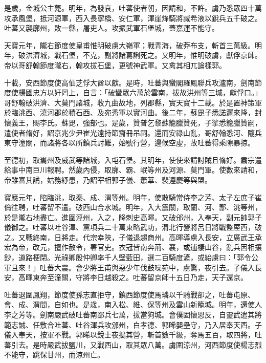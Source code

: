 \begin{pinyinscope}
 是歲，金城公主薨。明年，為發哀，吐蕃使者朝，因請和，不許。虜乃悉眾四十萬攻承風堡，抵河源軍，西入長寧橋、安仁軍，渾崖烽騎將臧希液以銳兵五千破之。吐蕃又襲廓州，敗一縣，屠吏人。攻振武軍石堡城，蓋嘉運不能守。



 天寶元年，隴右節度使皇甫惟明破虜大嶺軍；戰青海，破莽布支，斬首三萬級。明年，破洪濟城，戰石堡，不克，副將諸葛誗死之。又明年，惟明破虜，獻俘京師。帝以哥舒翰節度隴右，翰攻拔石堡，更號神武軍。又禽其相兀論樣郭。



 十載，安西節度使高仙芝俘大酋以獻。是時，吐蕃與蠻閣羅鳳聯兵攻瀘南，劍南節度使楊國忠方以奸罔上，自言：「破蠻眾六萬於雲南，拔故洪州等三城，獻俘口。」哥舒翰破洪濟、大莫門諸城，收九曲故地，列郡縣，實天寶十二載。於是置神策軍於臨洮西、澆河郡於積石西、及宛秀軍以實河曲。後二年，蘇毘子悉諾邏來降，封懷義王，賜李氏。蘇毘，強部也。是歲，贊普乞黎蘇籠臘贊死，子挲悉籠臘贊嗣，遣使者脩好，詔京兆少尹崔光遠持節齎冊吊祠。還而安祿山亂，哥舒翰悉河、隴兵東守潼關，而諸將各以所鎮兵討難，始號行營，邊候空虛，故吐蕃得乘隙暴掠。



 至德初，取巂州及威武等諸城，入屯石堡。其明年，使使來請討賊且脩好。肅宗遣給事中南巨川報聘。然歲內侵，取廓、霸、岷等州及河源、莫門軍。使數來請和，帝雖審其譎，姑務紓患，乃詔宰相郭子儀、蕭華、裴遵慶等與盟。



 寶應元年，陷臨洮，取秦、成、渭等州。明年，使散騎常侍李之芳、太子左庶子崔倫往聘，吐蕃留不遣。破西山合水城。明年，入大震關，取蘭、河、鄯、洮等州，於是隴右地盡亡。進圍涇州，入之，降刺史高暉。又破邠州，入奉天，副元帥郭子儀御之。吐蕃以吐谷渾、黨項兵二十萬東略武功，渭北行營將呂日將戰盩厔西，破之。又戰終南，日將走。代宗幸陜，子儀退趨商州。高暉導虜入長安，立廣武王承宏為帝，改元，擅作赦令，署官吏。衣冠皆南奔荊、襄，或逋棲山谷，亂兵因相攘鈔，道路梗閉。光祿卿殷仲卿率千人壁藍田，選二百騎度滻，或紿虜曰：「郭令公軍且來！」吐蕃大震。會少將王甫與惡少年伐鼓噪苑中，虜驚，夜引去。子儀入長安，高暉東奔至潼關，守將李日越殺之。吐蕃留京師十五日乃走，天子還京。



 吐蕃退圍鳳翔，節度使孫志直拒守，鎮西節度使馬璘以千騎戰卻之，吐蕃屯原、會、成、渭間，自如也。是歲，南入松、維、保等州及雲山新籠城。明年，還使人李之芳等。劍南嚴武破吐蕃南鄙兵七萬，拔當狗城。會僕固懷恩反，自靈武遣其將範志誠、任敷合吐蕃、吐谷渾兵攻邠州，白孝德、郭晞嬰壘守，乃入居奉天西。子儀入奉天，按軍不戰。郭晞以銳士夜搗其營，斬首數千級，奪馬五百，取四將，吐蕃引去。是時嚴武拔鹽川，又戰西山，取其眾八萬。虜圍涼州，河西節度使楊志烈不能守，跳保甘州，而涼州亡。




\end{pinyinscope}
